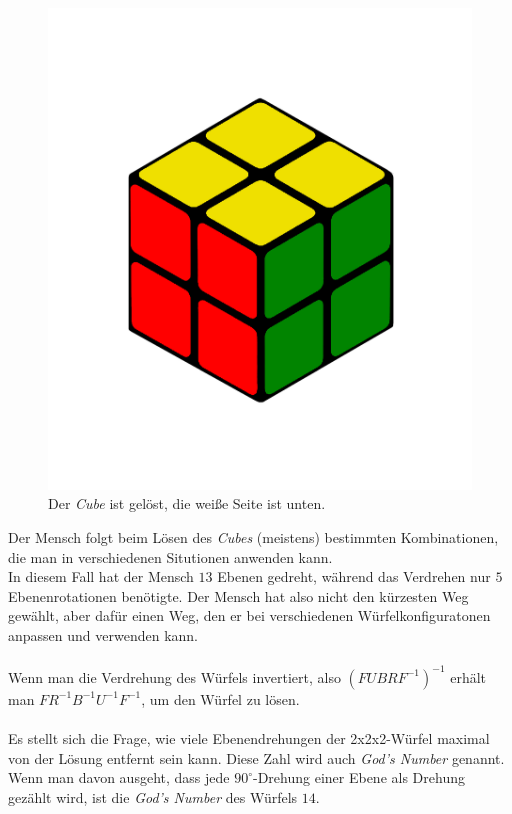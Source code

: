 \documentclass[12pt,a4paper, usenames, dvipsnames]{article}
\begin{document}
\begin{figure}[H]
\centering
\includegraphics[scale=0.12]{menschSchritt5.png}
\caption[Lösung von Mensch: Schritt 5]{Der \textit{Cube} ist gelöst, die weiße Seite ist unten.}
\end{figure}

Der Mensch folgt beim Lösen des \textit{Cubes} (meistens) bestimmten Kombinationen, die man in verschiedenen Situtionen anwenden kann. \\
In diesem Fall hat der Mensch $13$ Ebenen gedreht, während das Verdrehen nur $5$ Ebenenrotationen benötigte. Der Mensch hat also nicht den kürzesten Weg gewählt, aber dafür einen Weg, den er bei verschiedenen Würfelkonfiguratonen anpassen und verwenden kann. \\
\\
Wenn man die Verdrehung des Würfels invertiert, also $(FUBRF^{-1})^{-1}$ erhält man $FR^{-1}B^{-1}U^{-1}F^{-1}$, um den Würfel zu lösen.
\\
\\
Es stellt sich die Frage, wie viele Ebenendrehungen der 2x2x2-Würfel maximal von der Lösung entfernt sein kann. Diese Zahl wird auch \textit{God's Number} genannt. \\
Wenn man davon ausgeht, dass jede $90^\circ$-Drehung einer Ebene als Drehung gezählt wird, ist die \textit{God's Number} des Würfels $14$. \cite{DJ} 




















\newpage



\listoffigures

\newpage


\listoftables

\newpage


\printbibliography
\end{document}
